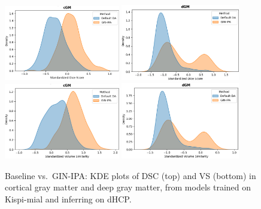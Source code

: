 \begin{figure}[htbp]
  \centering
  \includegraphics[width=0.45\textwidth]{figures/1_mial-dhcp_DC_cGM.png}\quad
  \includegraphics[width=0.46\textwidth]{figures/1_mial-dhcp_DC_dGM.png} \\
  \vspace{10pt}
  \includegraphics[width=0.45\textwidth]{figures/1_mial-dhcp_VS_cGM.png}\quad
  \includegraphics[width=0.46\textwidth]{figures/1_mial-dhcp_VS_dGM.png}
  \caption{Baseline vs.\ GIN-IPA: KDE plots of DSC (top) and VS (bottom) in cortical gray matter and deep gray matter, from models trained on Kispi-mial and inferring on dHCP.}
  \label{fig:1_mial_dhcp_gm}
\end{figure}

